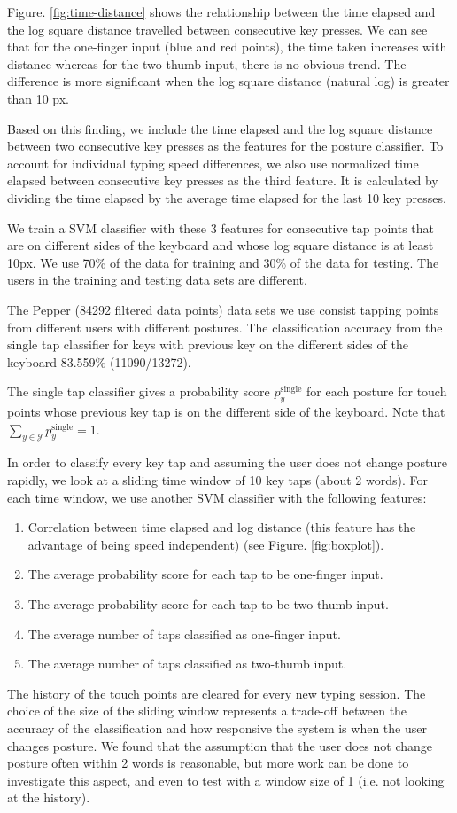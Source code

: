 \documentclass{sigchi}
\begin{document}
Figure. \ref{fig:time-distance} shows the relationship between the time elapsed 
and the log square distance travelled between consecutive key presses. We can
see that for the one-finger input (blue and red points), the time taken
increases with distance whereas for the two-thumb input, there is no obvious
trend. The difference is more significant when the log square distance (natural
log) is greater than 10 px.

Based on this finding, we include the time elapsed and the log square distance
between two consecutive key presses as the features for the posture classifier. 
To account for individual typing speed differences, we also use normalized time 
elapsed between consecutive key presses as the third feature. It is calculated 
by dividing the time elapsed by the average time elapsed for the last 10 key
presses.

We train a SVM classifier with these 3 features for consecutive tap points that 
are on different sides of the keyboard and whose log square distance is at least
10px. We use 70\% of the data for training and 30\% of the
data for testing. The users in the training and testing data sets are different.

The Pepper (84292 filtered data points) data sets we use consist tapping points 
from different users with different postures. The classification accuracy from
the single tap classifier for keys with previous key on the different sides of
the keyboard 83.559\% (11090/13272).

The single tap classifier gives a probability score $p_y^{\text{single}}$ for each posture for touch
points whose previous key tap is on the different side of the keyboard. Note that
$\displaystyle\sum_{y \in \mathcal{Y}}p_y^{\text{single}} = 1$.
 
In order to classify every key tap and assuming the user does not change posture 
rapidly, we look at a sliding time window of 10 key taps (about 2 words). For 
each time window, we use another SVM classifier with the following features:
\begin{enumerate}
\item Correlation between time elapsed and log distance (this feature has the
advantage of being speed independent) (see Figure. \ref{fig:boxplot}).
\item The average probability score for each tap to be one-finger input.
\item The average probability score for each tap to be two-thumb input.
\item The average number of taps classified as one-finger input.
\item The average number of taps classified as two-thumb input.
\end{enumerate}
The history of the touch points are cleared for every new typing session.
The choice of the size of the sliding window represents a trade-off between the 
accuracy of the classification and how responsive the system is when the user
changes posture. We found that the assumption that the user does not change posture
often within 2 words is reasonable, but more work can be done to investigate this
aspect, and even to test with a window size of 1 (i.e. not 
looking at the history).
\end{document}
